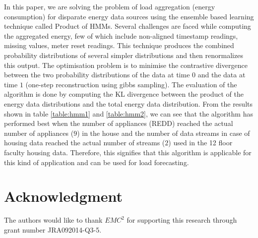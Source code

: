 \documentclass{acm_proc_article-sp}
\begin{document}
In this paper, we are solving the problem of load aggregation (energy consumption) for disparate energy data sources using the ensemble based learning technique called Product of HMMs. Several challenges are faced while computing the aggregated energy, few of which include non-aligned timestamp readings, missing values, meter reset readings. This technique produces the combined probability distributions of several simpler distributions and then renormalizes this output. The optimisation problem is to minimise the contrastive divergence between the two probability distributions of the data at time $0$ and the data at time $1$ (one-step reconstruction using gibbs sampling). The evaluation of the algorithm is done by computing the KL divergence between the product of the energy data distributions and the total energy data distribution. From the results shown in table \ref{table:hmm1} and \ref{table:hmm2}, we can see that the algorithm has performed best when the number of appliances (REDD) reached the actual number of appliances ($9$) in the house and the number of data streams in case of housing data reached the actual number of streams ($2$) used in the 12 floor faculty housing data. Therefore, this signifies that this algorithm is applicable for this kind of application and can be used for load forecasting.


\section*{Acknowledgment}
The authors would like to thank $EMC^2$ for supporting this research through grant number JRA092014-Q3-5.
%
%

\nocite{Zoha12articlenon-intrusive,CarrieArmel2013213,eps272990,NIPS2010,Rabiner,SS97a,Kawamoto,Diane,Klopfert,Ghahramani,Felice,Shen,taban,Albert,wijaya2014consumer,Zhang,achnata2012long,bassi,samuel,Falvo,Bakirtzis,Chen,Chow,DisaggregationHSMM,KolterJ12,KolterF11,BLTJ:BLTJ21650,Heinzelman00energy,Taylor,NYAS:NYAS5921,
Wijaya,5620917,1626400,mckerracher,hinton2000,aistats,fhmm,andrew}
\end{document}
